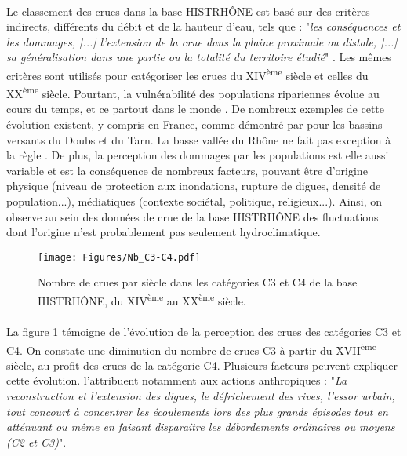 \documentclass[11pt]{article}
\begin{document}
	\paragraph{} Le classement des crues dans la base HISTRHÔNE est basé sur des critères indirects, différents du débit et de la hauteur d'eau, tels que : "\textit{les conséquences et les dommages, [...] l'extension de la crue dans la plaine proximale ou distale, [...] sa généralisation dans une partie ou la totalité du territoire étudié}" \citep{pichard_sept_2014}. Les mêmes critères sont utilisés pour catégoriser les crues du XIV\textsuperscript{ème} siècle et celles du XX\textsuperscript{ème} siècle. Pourtant, la vulnérabilité des populations ripariennes évolue au cours du temps, et ce partout dans le monde \citep{kron_flood_2002}. De nombreux exemples de cette évolution existent, y compris en France, comme démontré par \citet{boudou_assessing_2016} pour les bassins versants du Doubs et du Tarn. La basse vallée du Rhône ne fait pas exception à la règle \citep{piegay_observatoire_2022}. De plus, la perception des dommages par les populations est elle aussi variable et est la conséquence de nombreux facteurs, pouvant être d'origine physique (niveau de protection aux inondations, rupture de digues, densité de population...), médiatiques (contexte sociétal, politique, religieux...). Ainsi, on observe au sein des données de crue de la base HISTRHÔNE des fluctuations dont l'origine n'est probablement pas seulement hydroclimatique. 
	
	\begin{figure}[h]
	\centering
		\texttt{[image: Figures/Nb\_C3-C4.pdf]}
        \caption{Nombre de crues par siècle dans les catégories C3 et C4 de la base HISTRHÔNE, du XIV\textsuperscript{ème} au XX\textsuperscript{ème} siècle.}
		\label{fig:Nb_C3C4}
	\end{figure}	
	
	\paragraph{} La figure \ref{fig:Nb_C3C4} témoigne de l'évolution de la perception des crues des catégories C3 et C4. On constate une diminution du nombre de crues C3 à partir du XVII\textsuperscript{ème} siècle, au profit des crues de la catégorie C4. Plusieurs facteurs peuvent expliquer cette évolution. \citet{pichard_sept_2014} l'attribuent notamment aux actions anthropiques : "\textit{La reconstruction et l'extension des digues, le défrichement des rives, l'essor urbain, tout concourt à concentrer les écoulements lors des plus grands épisodes tout en atténuant ou même en faisant disparaître les débordements ordinaires ou moyens (C2 et C3)}".
	
\end{document}
